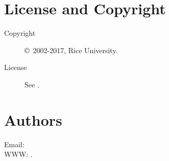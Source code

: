 \documentclass[english]{article}
\begin{document}
\section{License and Copyright}

\begin{description}
\item[Copyright] \copyright\ 2002-2017, Rice University.
\item[License] See .
\end{description}

\section{Authors}

Email:  \\
WWW: .

\LatexManEnd
\end{document}
